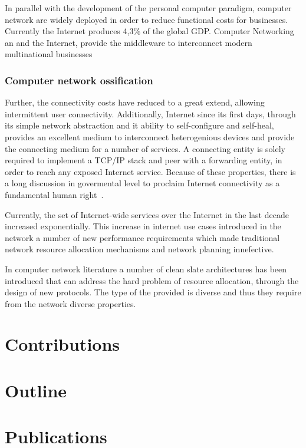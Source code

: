 In parallel with the development of the personal computer paradigm, computer
network are widely deployed in order to reduce functional costs for businesses.
Currently the Internet produces 4,3\% of the global GDP. Computer Networking an
and the Internet, provide the middleware to interconnect modern multinational businesses 



\subsubsection{Computer network ossification}




Further, the connectivity costs have reduced to a great extend, allowing
intermittent user connectivity.  Additionally, Internet since its first days,
through its simple network abstraction and it ability to self-configure and
self-heal, provides an excellent medium to interconnect heterogenious devices
and provide the connecting medium for a number of services. A connecting entity
is solely required to implement a TCP/IP stack and peer with a forwarding
entity, in order to reach any exposed Internet service.  Because of these
properties, there is a long discussion in govermental level to proclaim Internet
connectivity as a fundamental human right~\cite{klang2005human}.




Currently, the set of Internet-wide services over the Internet in the last
decade increased exponentially. This increase in internet use cases introduced
in the network a number of new performance requirements which made traditional
network resource allocation mechanisms and network planning innefective.

In computer network literature a number of clean slate architectures has been
introduced that can address the hard problem of resource allocation, through the
design of new protocols. 
The type of the provided is diverse and thus they require
from the network diverse properties. 


\section{Contributions}
\label{sec:intro:contributions}

\section{Outline}
\label{sec:intro:outline}

\section{Publications}
\label{sec:intro:pubs}

